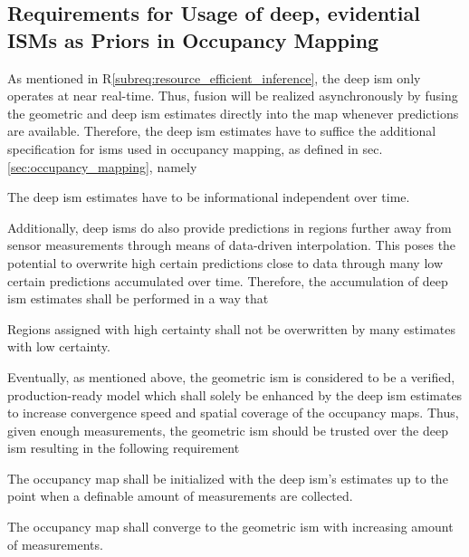 \subsection{Requirements for Usage of deep, evidential ISMs as Priors in Occupancy Mapping}
\label{subsec:requirements_for_usage_of_deep_ims_as_priors_in_occmapping}
As mentioned in R\ref{subreq:resource_efficient_inference}, the deep \gls{ism} only operates at near real-time. Thus, fusion will be realized asynchronously by fusing the geometric and deep \gls{ism} estimates directly into the map whenever predictions are available. Therefore, the deep \gls{ism} estimates have to suffice the additional specification for \gls{ism}s used in occupancy mapping, as defined in sec. \ref{sec:occupancy_mapping}, namely
\\
\setcounter{req}{2}
\setcounter{subreq}{0}
\begin{subreq} \label{subreq:indep_info}
	The deep \gls{ism} estimates have to be informational independent over time.
\end{subreq}
Additionally, deep \gls{ism}s do also provide predictions in regions further away from sensor measurements through means of data-driven interpolation. This poses the potential to overwrite high certain predictions close to data through many low certain predictions accumulated over time. Therefore, the accumulation of deep \gls{ism} estimates shall be performed in a way that
\\
\begin{subreq} \label{subreq:no_falsification}
	Regions assigned with high certainty shall not be overwritten by many estimates with low certainty. 
\end{subreq}
Eventually, as mentioned above, the geometric \gls{ism} is considered to be a verified, production-ready model which shall solely be enhanced by the deep \gls{ism} estimates to increase convergence speed and spatial coverage of the occupancy maps. Thus, given enough measurements, the geometric \gls{ism} should be trusted over the deep \gls{ism} resulting in the following requirement
\begin{subreq} \label{subreq:initialize_with_deep_ism}
	The occupancy map shall be initialized with the deep \gls{ism}'s estimates up to the point when a definable amount of measurements are collected.
\end{subreq}
\begin{subreq} \label{subreq:converge_to_geo_ism}
	The occupancy map shall converge to the geometric \gls{ism} with increasing amount of measurements.
\end{subreq}
%
